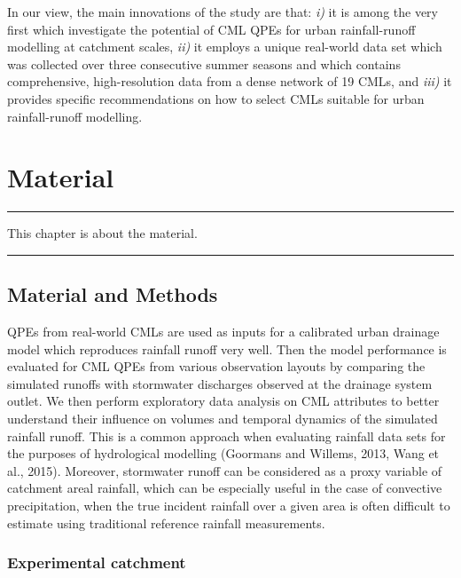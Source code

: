 \documentclass{ctuthesis}\usepackage[]{graphicx}\usepackage[]{color}
\begin{document}
In our view, the main innovations of the study are that: \emph{i)} it is among the very first which investigate the potential of CML QPEs for urban rainfall-runoff modelling at catchment scales, \emph{ii)} it employs a unique real-world data set which was collected over three consecutive summer seasons and which contains comprehensive, high-resolution data from a dense network of 19 CMLs, and \emph{iii)} it provides specific recommendations on how to select CMLs suitable for urban rainfall-runoff modelling.





        
        


\chapter{Material} \label{chap2}

\rule{\textwidth}{0.4pt}
This chapter is about the material. \newline
\rule[0.2cm]{\textwidth}{0.4pt}



\section{Material and Methods}

QPEs from real-world CMLs are used as inputs for a calibrated urban drainage model which reproduces rainfall runoff very well. Then the model performance is evaluated for CML QPEs from various observation layouts by comparing the simulated runoffs with stormwater discharges observed at the drainage system outlet. We then perform exploratory data analysis on CML attributes to better understand their influence on volumes and temporal dynamics of the simulated rainfall runoff. This is a common approach when evaluating rainfall data sets for the purposes of hydrological modelling (Goormans and Willems, 2013, Wang et al., 2015). Moreover, stormwater runoff can be considered as a proxy variable of catchment areal rainfall, which can be especially useful in the case of convective precipitation, when the true incident rainfall over a given area is often difficult to estimate using traditional reference rainfall measurements.

\subsection{Experimental catchment}
\end{document}
